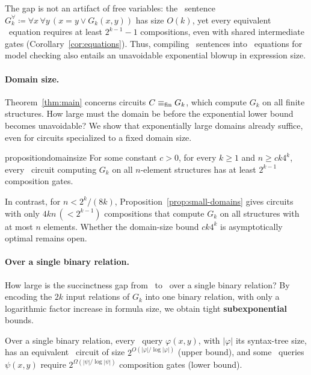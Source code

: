 The gap is not an artifact of free variables: the \FOthree\ sentence
$G_k^\forall\coloneqq\forall x\,\forall y\,(x=y\lor G_k(x,y))$
has size $O(k)$, yet every equivalent \CoR\ equation requires at
least $2^{k-1}-1$ compositions, even with shared intermediate gates
(Corollary~\ref{cor:equations}).
Thus, compiling \FOthree\ sentences into \CoR\ equations for model
checking also entails an unavoidable exponential blowup in expression size.

\paragraph{Domain size.}
Theorem~\ref{thm:main} concerns circuits $C\equiv_{\mathrm{fin}} G_k$, which compute $G_k$ on all finite structures.
How large must the domain be before the exponential
lower bound becomes unavoidable?
We show that exponentially large domains already
suffice, even for circuits specialized to a fixed
domain size.

\begin{restatable}{proposition}{domainsize}\label{prop:domain-size}
For some constant $c>0$, for every $k\ge1$
and $n\ge ck4^k$, every \CoR\ circuit
computing $G_k$ on all $n$-element structures
has at least $2^{k-1}$ composition gates.
\end{restatable}

In contrast, for $n<2^k/(8k)$, Proposition~\ref{prop:small-domains} gives
circuits with only $4kn\,(< 2^{k-1})$ compositions
that compute $G_k$ on all structures with at most $n$ elements.
Whether the domain-size bound $ck4^k$ is
asymptotically optimal remains open.

\paragraph{Over a single binary relation.}
How large is the succinctness gap from \FOthree\ to \CoR\ over a single binary relation? By encoding the $2k$ input relations of $G_k$ into one binary relation,
with only a logarithmic factor increase in formula size, we obtain tight \textbf{subexponential} bounds.

\begin{theorem}
\label{thm:fixed-vocabulary}
Over a single binary relation, every \FOthree\ query $\varphi(x, y)$, with $|\varphi|$ its syntax-tree size,
has an equivalent \CoR\ circuit of size $2^{O(|\varphi|/\log |\varphi|)}$ (upper bound),
and some \FOthree\ queries $\psi(x, y)$ require
$2^{\Omega(|\psi|/\log |\psi|)}$ composition gates (lower bound).
\end{theorem}

